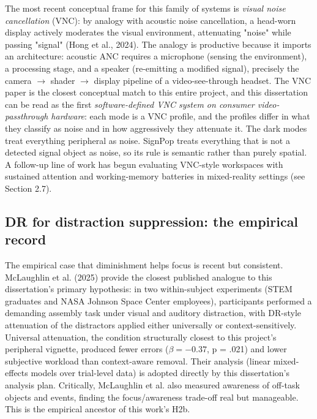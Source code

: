 The most recent conceptual frame for this family of systems is \textit{visual noise cancellation} (VNC): by
analogy with acoustic noise cancellation, a head-worn display actively moderates the visual
environment, attenuating "noise" while passing "signal" (Hong et al., 2024). The analogy is productive
because it imports an architecture: acoustic ANC requires a
microphone (sensing the environment), a processing stage, and a speaker (re-emitting a modified
signal), precisely the camera $\rightarrow$ shader $\rightarrow$ display pipeline of a video-see-through headset. The VNC
paper is the closest conceptual match to this entire project, and this dissertation can be read as
the first \textit{software-defined VNC system on consumer video-passthrough hardware}: each mode is a VNC
profile, and the profiles differ in what they classify as noise and in how aggressively they
attenuate it. The dark modes treat everything peripheral as noise. SignPop treats everything that is
not a detected signal object as noise, so its rule is semantic rather than purely spatial. A follow-up line of work has begun evaluating VNC-style workspaces with sustained
attention and working-memory batteries in mixed-reality settings (see Section 2.7).

\subsection{DR for distraction suppression: the empirical record}

The empirical case that diminishment helps focus is recent but consistent. McLaughlin et al. (2025)
provide the closest published analogue to this dissertation's primary hypothesis: in two
within-subject experiments (STEM graduates and NASA Johnson Space Center employees), participants
performed a demanding assembly task under visual and auditory distraction, with DR-style attenuation
of the distractors applied either universally or context-sensitively. Universal attenuation, the
condition structurally closest to this project's peripheral vignette, produced fewer errors
($\beta = -0.37$, p = .021) and lower subjective workload than context-aware removal. Their analysis
(linear mixed-effects models over trial-level data) is adopted directly by this dissertation's
analysis plan. Critically, McLaughlin et al. also measured awareness of off-task objects and events,
finding the focus/awareness trade-off real but manageable. This is the empirical ancestor of this
work's H2b.

